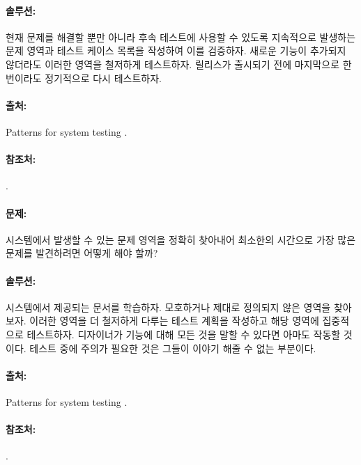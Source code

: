 \documentclass[a4paper,10pt,twoside]{book}
\begin{document}
\paragraph*{솔루션:}
현재 문제를 해결할 뿐만 아니라 후속 테스트에 사용할 수 있도록 지속적으로 발생하는 문제 영역과 테스트 케이스 목록을 작성하여 이를 검증하자. 새로운 기능이 추가되지 않더라도 이러한 영역을 철저하게 테스트하자. 릴리스가 출시되기 전에 마지막으로 한 번이라도 정기적으로 다시 테스트하자.

\paragraph*{출처:}
Patterns for system testing \cite{DeLa98a}.

\paragraph*{참조처:}
.


\paragraph*{문제:}
시스템에서 발생할 수 있는 문제 영역을 정확히 찾아내어 최소한의 시간으로 가장 많은 문제를 발견하려면 어떻게 해야 할까?

\paragraph*{솔루션:}
시스템에서 제공되는 문서를 학습하자. 모호하거나 제대로 정의되지 않은 영역을 찾아보자. 이러한 영역을 더 철저하게 다루는 테스트 계획을 작성하고 해당 영역에 집중적으로 테스트하자. 디자이너가 기능에 대해 모든 것을 말할 수 있다면 아마도 작동할 것이다. 테스트 중에 주의가 필요한 것은 그들이 이야기 해줄 수 없는 부분이다.

\paragraph*{출처:}
Patterns for system testing \cite{DeLa98a}.

\paragraph*{참조처:}
.
\end{document}
